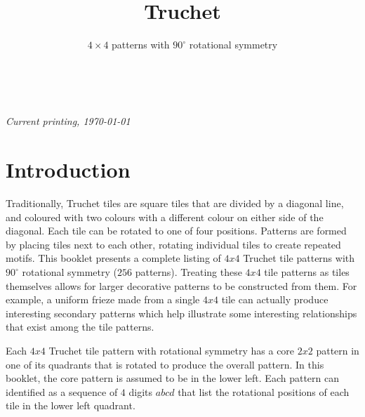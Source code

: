 \documentclass{tufte-book}
\title{Truchet}
\subtitle{$4\times4$ patterns with $90^{\circ}$ rotational symmetry}
\author[]{}
\begin{document}



\maketitle


\newpage
\begin{fullwidth}
~\vfill
\thispagestyle{empty}
\setlength{\parindent}{0pt}
\setlength{\parskip}{\baselineskip}



\par\textit{Current printing, \today}
\end{fullwidth}




\cleardoublepage



\chapter*{Introduction}

\noindent
Traditionally, Truchet tiles are square tiles that are divided by a diagonal line, and coloured with two colours with a different colour on either side of the diagonal. Each tile can be rotated to one of four positions. Patterns are formed by placing tiles next to each other, rotating individual tiles to create repeated motifs.
This booklet presents a complete listing of $4x4$ Truchet tile patterns with $90^{\circ}$ rotational symmetry ($256$ patterns). \marginnote{\centering} Treating these $4x4$ tile patterns as tiles themselves allows for larger decorative patterns to be constructed from them. For example, a uniform frieze made from a single $4x4$ tile can actually produce interesting secondary patterns which help illustrate some interesting relationships that exist among the tile patterns.  

\vspace{0.5cm}
\noindent
Each $4x4$
Truchet tile pattern with rotational symmetry has a core $2x2$ pattern in one of its quadrants that is rotated to produce the overall pattern. \marginnote{\centering} In this booklet, the core pattern is assumed to be in the lower left. Each pattern can identified as a sequence of $4$ digits $abcd$ that list the rotational positions of each tile in the lower left quadrant.
\end{document}
